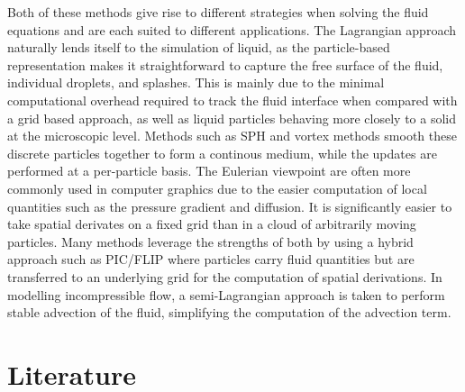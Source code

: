 \documentclass[a4paper, 11pt, titlepage]{article}
\begin{document}
Both of these methods give rise to different strategies when solving the fluid
equations and are each suited to different applications. The Lagrangian approach
naturally lends itself to the simulation of liquid, as the particle-based
representation makes it straightforward to capture the free surface of the
fluid, individual droplets, and splashes. This is mainly due to the minimal
computational overhead required to track the fluid interface when compared with
a grid based approach, as well as liquid particles behaving more closely to a
solid at the microscopic level. Methods such as SPH \cite{koschier2020smoothed}
and vortex methods \cite{park2005vortex} smooth
these discrete particles together to form a continous medium, while the updates
are performed at a per-particle basis. The Eulerian viewpoint are often more
commonly used in computer graphics due to the easier computation of local
quantities such as the pressure gradient and diffusion. It is significantly
easier to take spatial derivates on a fixed grid than in a cloud of arbitrarily
moving particles. Many methods leverage the strengths of both by using a hybrid
approach such as PIC/FLIP\cite{salomonsson2011pic} where particles carry fluid quantities but are
transferred to an underlying grid for the computation of spatial derivations. In
modelling incompressible flow, a semi-Lagrangian approach is taken to perform
stable advection of the fluid, simplifying the computation of the advection term.

\section{Literature}
\end{document}
